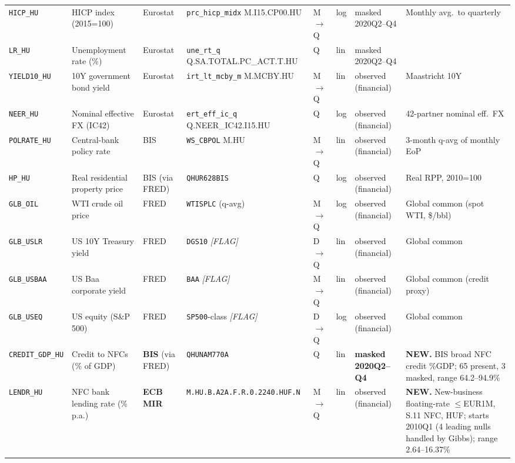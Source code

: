 {\begin{longtable}{@{}p{2.0cm}p{2.7cm}p{1.4cm}p{2.8cm}p{0.7cm}p{0.85cm}p{1.5cm}p{2.3cm}@{}}
\texttt{HICP\_HU}   & HICP index (2015=100)         & Eurostat & \texttt{prc\_hicp\_midx} M.I15.CP00.HU                  & M$\to$Q & log & masked 2020Q2--Q4 & Monthly avg.\ to quarterly \\
\texttt{LR\_HU}     & Unemployment rate (\%)        & Eurostat & \texttt{une\_rt\_q} Q.SA.TOTAL.PC\_ACT.T.HU             & Q & lin & masked 2020Q2--Q4 & \\
\texttt{YIELD10\_HU}& 10Y government bond yield     & Eurostat & \texttt{irt\_lt\_mcby\_m} M.MCBY.HU                     & M$\to$Q & lin & observed (financial) & Maastricht 10Y \\
\texttt{NEER\_HU}   & Nominal effective FX (IC42)   & Eurostat & \texttt{ert\_eff\_ic\_q} Q.NEER\_IC42.I15.HU            & Q & log & observed (financial) & 42-partner nominal eff.\ FX \\
\texttt{POLRATE\_HU}& Central-bank policy rate      & BIS & \texttt{WS\_CBPOL} M.HU                                 & M$\to$Q & lin & observed (financial) & 3-month q-avg of monthly EoP \\
\texttt{HP\_HU}     & Real residential property price & BIS (via FRED) & \texttt{QHUR628BIS}                          & Q & log & observed (financial) & Real RPP, 2010=100 \\
\texttt{GLB\_OIL}   & WTI crude oil price           & FRED & \texttt{WTISPLC} (q-avg)                               & M$\to$Q & log & observed (financial) & Global common (spot WTI, \$/bbl) \\
\texttt{GLB\_USLR}  & US 10Y Treasury yield         & FRED & \texttt{DGS10} \textit{[FLAG]}                          & D$\to$Q & lin & observed (financial) & Global common \\
\texttt{GLB\_USBAA} & US Baa corporate yield        & FRED & \texttt{BAA} \textit{[FLAG]}                            & M$\to$Q & lin & observed (financial) & Global common (credit proxy) \\
\texttt{GLB\_USEQ}  & US equity (S\&P 500)          & FRED & \texttt{SP500}-class \textit{[FLAG]}                    & D$\to$Q & log & observed (financial) & Global common \\
\texttt{CREDIT\_GDP\_HU} & Credit to NFCs (\% of GDP) & \textbf{BIS} (via FRED) & \texttt{QHUNAM770A}                       & Q & lin & \textbf{masked 2020Q2--Q4} & \textbf{NEW.} BIS broad NFC credit \%GDP; 65 present, 3 masked, range 64.2--94.9\% \\
\texttt{LENDR\_HU}  & NFC bank lending rate (\% p.a.) & \textbf{ECB MIR} & \texttt{M.\allowbreak HU.\allowbreak B.\allowbreak A2A.\allowbreak F.\allowbreak R.0.2240.\allowbreak HUF.\allowbreak N}                 & M$\to$Q & lin & observed (financial) & \textbf{NEW.} New-business floating-rate $\le$EUR1M, S.11 NFC, HUF; starts 2010Q1 (4 leading nulls handled by Gibbs); range 2.64--16.37\% \\
\end{longtable}}


